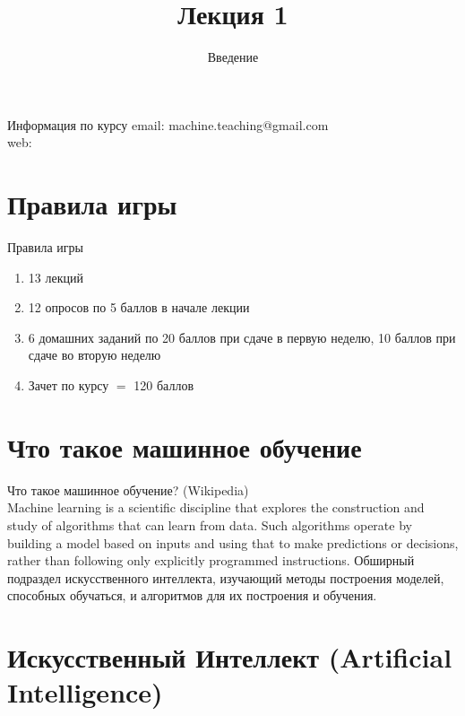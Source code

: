 \documentclass[10pt]{beamer}
\title{Лекция 1}
\subtitle{Введение}
\begin{document}
\maketitle

\begin{frame}{Информация по курсу}
  email: machine.teaching@gmail.com \\
  web: \\
\end{frame}

\section{Правила игры}

\begin{frame}{Правила игры}
  \begin{enumerate} [-]  
    \item 13 лекций
    \item 12 опросов по 5 баллов в начале лекции
    \item 6 домашних заданий по 20 баллов при сдаче в первую неделю, 10 баллов при сдаче во вторую неделю
    \bigbreak
    \item Зачет по курсу $=$ \alert{120 баллов}
  \end{enumerate}  
\end{frame}

\section{Что такое машинное обучение}

{
\begin{frame}{Что такое машинное обучение?}
  \alert{(Wikipedia)}\\
  Machine learning is a scientific discipline that explores the construction and study of algorithms that can learn from data. Such algorithms operate by building a model based on inputs and using that to make predictions or decisions, rather than following only explicitly programmed instructions. 
  \bigbreak
  Обширный подраздел искусственного интеллекта, изучающий методы построения моделей, способных обучаться, и алгоритмов для их построения и обучения.\\
\end{frame}
}

\section{Искусственный Интеллект (Artificial Intelligence)}
\end{document}
